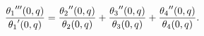 \[\frac{\mathop{\theta_{1}\/}\nolimits'''\!\left(0,q\right)}{\mathop{\theta_{1}%
\/}\nolimits'\!\left(0,q\right)}=\frac{\mathop{\theta_{2}\/}\nolimits''\!\left%
(0,q\right)}{\mathop{\theta_{2}\/}\nolimits\!\left(0,q\right)}+\frac{\mathop{%
\theta_{3}\/}\nolimits''\!\left(0,q\right)}{\mathop{\theta_{3}\/}\nolimits\!%
\left(0,q\right)}+\frac{\mathop{\theta_{4}\/}\nolimits''\!\left(0,q\right)}{%
\mathop{\theta_{4}\/}\nolimits\!\left(0,q\right)}.\]